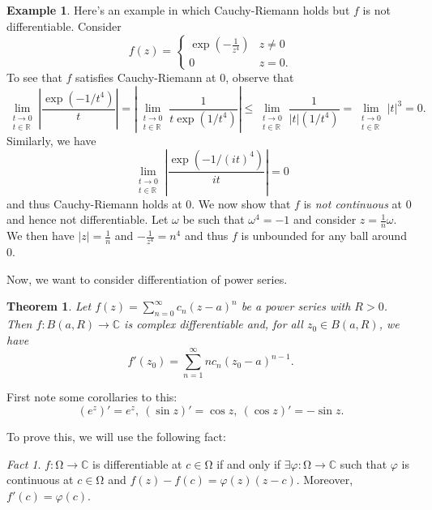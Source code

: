 \documentclass[letterpaper,12pt]{article}
\theoremstyle{definition}
\newtheorem{example}{Example}[section]
\theoremstyle{plain}
\newtheorem{thm}{Theorem}[section]
\theoremstyle{remark}
\newtheorem*{fact}{Fact}
\newcommand{\R}{\mathbb{R}}
\newcommand{\C}{\mathbb{C}}
\let\oldOmega\Omega
\renewcommand{\Omega}{\mathrm{\oldOmega}}
\begin{document}
\begin{example}
Here's an example in which Cauchy-Riemann holds but $f$ is not differentiable. Consider
\[
f(z) = \begin{cases}
\exp \left(-\frac{1}{z^4}\right) & z\ne 0 \\
0 & z=0.
\end{cases}
\]
To see that $f$ satisfies Cauchy-Riemann at $0$, observe that
\[\lim_{\substack{t\to 0\\t\in \R}} \left|\frac{\exp(-1/t^4)}{t}\right| = \left|\lim_{\substack{t\to 0\\t\in \R}} \frac{1}{t\exp(1/t^4)}\right| \leq \lim_{\substack{t\to 0\\t\in \R}} \frac{1}{|t|(1/t^4)} = \lim_{\substack{t\to 0\\t\in \R}}|t|^3 = 0.\]
Similarly, we have
\[\lim_{\substack{t\to 0\\t\in \R}} \left|\frac{\exp(-1/(it)^4)}{it}\right| = 0\]
and thus Cauchy-Riemann holds at $0$. We now show that $f$ is \emph{not continuous} at $0$ and hence not differentiable. Let $\omega$ be such that $\omega^4 = -1$ and consider $z=\frac1n\omega$. We then have $|z| = \frac1n$ and $-\frac{1}{z^4} = n^4$ and thus $f$ is unbounded for any ball around $0$.
\end{example}

Now, we want to consider differentiation of power series.

\begin{thm}\label{thm:PSeriesDiff}
Let $f(z) = \sum_{n=0}^\infty c_n(z-a)^n$ be a power series with $R>0$. Then $f:B(a,R)\to \mathbb{C}$ is complex differentiable and, for all $z_0\in B(a,R)$, we have
\[f'(z_0) = \sum_{n=1}^\infty nc_n(z_0-a)^{n-1}.\]
\end{thm}

First note some corollaries to this:
\[(e^z)'=e^z,\ (\sin z)'=\cos z,\ (\cos z)'=-\sin z.\]

To prove this, we will use the following fact:

\begin{fact}
$f:\Omega\to \C$ is differentiable at $c\in \Omega$ if and only if $\exists \varphi:\Omega\to \C$ such that $\varphi$ is continuous at $c\in \Omega$ and $f(z)-f(c)=\varphi(z)(z-c)$. Moreover, $f'(c)=\varphi(c)$.
\end{fact}
\end{document}

